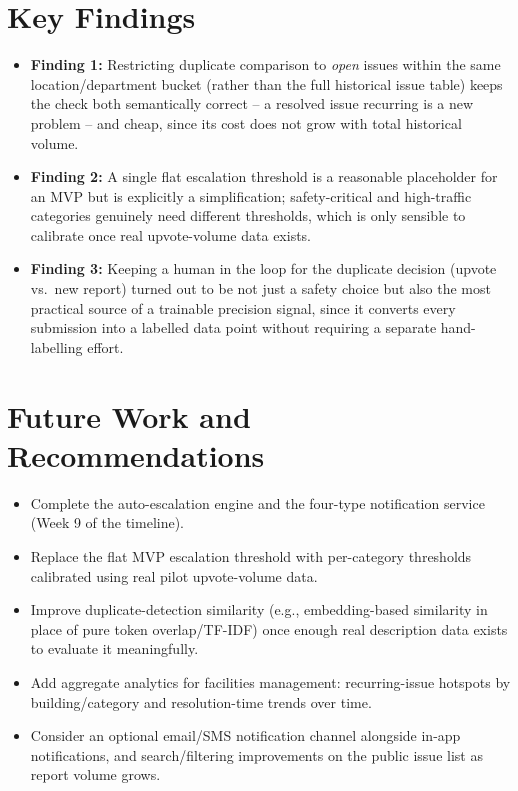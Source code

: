 \documentclass[11pt]{report}
\begin{document}
\section{Key Findings}

\begin{itemize}
  \item \textbf{Finding 1:} Restricting duplicate comparison to
    \emph{open} issues within the same location/department bucket
    (rather than the full historical issue table) keeps the check both
    semantically correct -- a resolved issue recurring is a new problem
    -- and cheap, since its cost does not grow with total historical
    volume.
  \item \textbf{Finding 2:} A single flat escalation threshold is a
    reasonable placeholder for an MVP but is explicitly a simplification;
    safety-critical and high-traffic categories genuinely need different
    thresholds, which is only sensible to calibrate once real
    upvote-volume data exists.
  \item \textbf{Finding 3:} Keeping a human in the loop for the
    duplicate decision (upvote vs.\ new report) turned out to be not
    just a safety choice but also the most practical source of a
    trainable precision signal, since it converts every submission into
    a labelled data point without requiring a separate hand-labelling
    effort.
\end{itemize}

\section{Future Work and Recommendations}

\begin{itemize}
  \item Complete the auto-escalation engine and the four-type
    notification service (Week 9 of the timeline).
  \item Replace the flat MVP escalation threshold with per-category
    thresholds calibrated using real pilot upvote-volume data.
  \item Improve duplicate-detection similarity (e.g., embedding-based
    similarity in place of pure token overlap/TF-IDF) once enough real
    description data exists to evaluate it meaningfully.
  \item Add aggregate analytics for facilities management: recurring-issue
    hotspots by building/category and resolution-time trends over time.
  \item Consider an optional email/SMS notification channel alongside
    in-app notifications, and search/filtering improvements on the
    public issue list as report volume grows.
\end{itemize}
\end{document}
